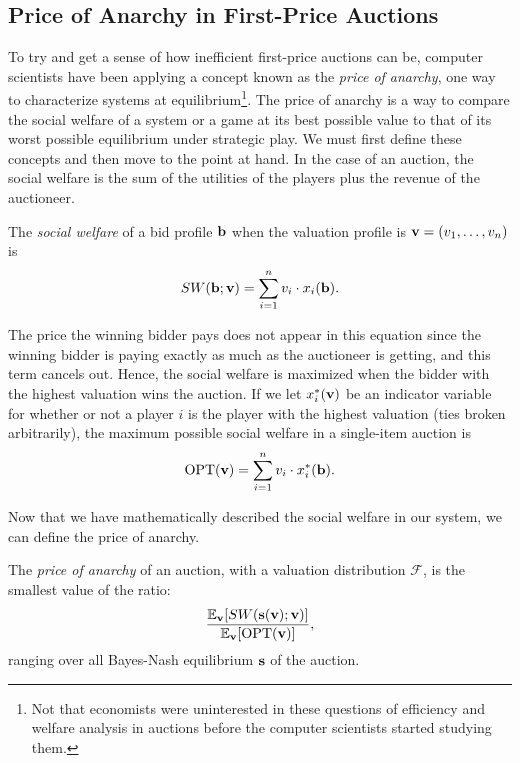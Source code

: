 \documentclass[12pt,twoside]{reedthesis}
\begin{document}
\subsection{Price of Anarchy in First-Price Auctions}  
To try and get a sense of how inefficient first-price auctions can be, computer scientists have been applying a concept known as the {\em price of anarchy}, one way to characterize systems at equilibrium\footnote{Not that economists were uninterested in these questions of efficiency and welfare analysis in auctions before the computer scientists started studying them.}. The price of anarchy is a way to compare the social welfare of a system or a game at its best possible value to that of its worst possible equilibrium under strategic play. We must first define these concepts and then move to the point at hand. In the case of an auction, the social welfare is the sum of the utilities of the players plus the revenue of the auctioneer.

\begin{dfn}
	The \textit{social welfare} of a bid profile $\textbf{b}$ when the valuation profile is $\textbf{v} = (v_1, \ldots, v_n)$ is 
	$$ SW(\textbf{b};\textbf{v}) = \sum_{i=1}^{n} v_i \cdot x_i (\textbf{b}).$$
\end{dfn}

The price the winning bidder pays does not appear in this equation since the winning bidder is paying exactly as much as the auctioneer is getting, and this term cancels out. Hence, the social welfare is maximized when the bidder with the highest valuation wins the auction. If we let $x^*_i(\textbf{v})$ be an indicator variable for whether or not a player $i$ is the player with the highest valuation (ties broken arbitrarily), the maximum possible social welfare in a single-item auction is 
$$ \text{OPT}(\textbf{v}) = \sum_{i=1}^{n} v_i \cdot x^*_i (\textbf{b}).$$

Now that we have mathematically described the social welfare in our system, we can define the price of anarchy. 

\begin{dfn}
	The \textit{price of anarchy} of an auction, with a valuation distribution $\mathcal{F}$, is the smallest value of the ratio:
	\begin{equation}
	\frac{\mathbb{E}_{\textbf{v}} [SW(\textbf{s}(\textbf{v});\textbf{v})]}{\mathbb{E}_{\textbf{v}}[\text{OPT}(\textbf{v})]},
	\label{eq:POA}
	\end{equation}
	ranging over all Bayes-Nash equilibrium $\textbf{s}$ of the auction.
\end{dfn}
\end{document}
